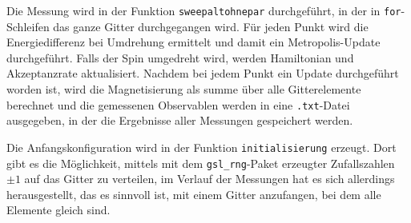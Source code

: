 	Die Messung wird in der Funktion \texttt{sweepaltohnepar} durchgeführt, in der in \texttt{for}-Schleifen das ganze Gitter durchgegangen wird. Für jeden Punkt wird die Energiedifferenz bei Umdrehung ermittelt und damit ein Metropolis-Update durchgeführt. Falls der Spin umgedreht wird, werden Hamiltonian und Akzeptanzrate aktualisiert. Nachdem bei jedem Punkt ein Update durchgeführt worden ist, wird die Magnetisierung als summe über alle Gitterelemente berechnet und die gemessenen Observablen werden in eine \texttt{.txt}-Datei ausgegeben, in der die Ergebnisse aller Messungen gespeichert werden.
	
	
	Die Anfangskonfiguration wird in der Funktion \texttt{initialisierung} erzeugt. Dort gibt es die Möglichkeit, mittels mit dem \texttt{gsl\_rng}-Paket\cite{gsldoc} erzeugter Zufallszahlen $\pm 1$ auf das Gitter zu verteilen, im Verlauf der Messungen hat es sich allerdings herausgestellt, das es sinnvoll ist, mit einem Gitter anzufangen, bei dem alle Elemente gleich sind. 
	
